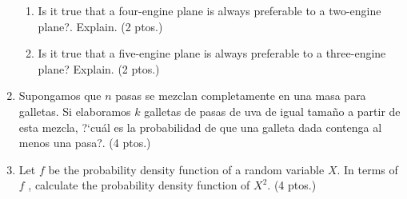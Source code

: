 \documentclass[a4paper,10pt]{report}
\begin{document}
\begin{enumerate}
\begin{enumerate}
\item Is it true that a four-engine plane is always preferable to a two-engine plane?. Explain. \hfill{(2 ptos.)}
\item Is it true that a five-engine plane is always preferable to a three-engine plane?
Explain. \hfill{(2 ptos.)}
\end{enumerate}
\item Supongamos que $n$ pasas se mezclan completamente en una masa para galletas. Si elaboramos $k$ galletas de pasas de uva de igual tama\~no a partir de esta mezcla, ?`cu\'al es la probabilidad de que una galleta dada contenga al menos una pasa?. \hfill{(4 ptos.)}
\item Let $f$ be the probability density function of a random variable $X$. In terms of $f$ ,
 calculate the probability density function of $X^2$. \hfill{(4 ptos.)}
\end{enumerate}
\end{document}
